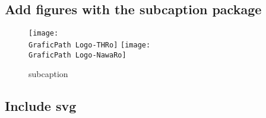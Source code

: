  \subsection{Add figures with the subcaption package}
 \begin{figure}[htb]
 	\centering
 	{\texttt{[image: \\GraficPath Logo-THRo]} }
 	{\texttt{[image: \\GraficPath Logo-NawaRo]} }
 	\caption[subcaption]{subcaption}\label{FigureAB}
 \end{figure}
 \subsection{Include svg}
% 	
% 	


